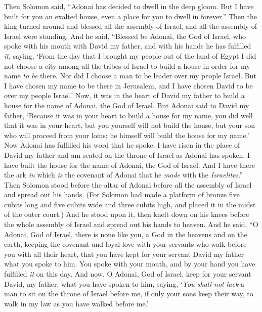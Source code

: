 \begin{biblechapter} %
 Then Solomon said, “Adonai has decided to dwell in the deep gloom.
\verse But I have built for you an exalted house, even a place for you to dwell in forever.”
\verse Then the king turned around and blessed all the assembly of Israel, and all the assembly of Israel were standing.
\verse And he said, “Blessed be Adonai, the God of Israel, who spoke with his mouth with David my father, and with his hands he has fulfilled \textit{it}, saying,
\verse ‘From the day that I brought my people out of the land of Egypt I did not choose a city among all the tribes of Israel to build a house in order for my name \textit{to be} there. Nor did I choose a man to be leader over my people Israel.
\verse But I have chosen my name to be there in Jerusalem, and I have chosen David to be over my people Israel.’
\verse Now, it was in the heart of David my father to build a house for the name of Adonai, the God of Israel.
\verse But Adonai said to David my father, ‘Because it was in your heart to build a house for my name, you did well that it was in your heart,
\verse but you yourself will not build the house, but your son who will proceed from your loins; he himself will build the house for my name.’
\verse Now Adonai has fulfilled his word that he spoke. I have risen in the place of David my father and am seated on the throne of Israel as Adonai has spoken. I have built the house for the name of Adonai, the God of Israel.
\verse And I have there the ark \textit{in} which \textit{is} the covenant of Adonai that he \textit{made} with the \textit{Israelites}.”
 Then Solomon stood before the altar of Adonai before all the assembly of Israel and spread out his hands.
\verse (For Solomon had made a platform of bronze five cubits long and five cubits wide and three cubits high, and placed it in the midst of the outer court.) And he stood upon it, then knelt down on his knees before the whole assembly of Israel and spread out his hands to heaven.
\verse And he said, “O Adonai, God of Israel, there is none like you, a God in the heavens and on the earth, keeping the covenant and loyal love with your servants who walk before you with all their heart,
\verse that you have kept for your servant David my father what you spoke to him. You spoke with your mouth, and by your hand you have fulfilled \textit{it} on this day.
\verse And now, O Adonai, God of Israel, keep for your servant David, my father, what you have spoken to him, saying, ‘\textit{You shall not lack} a man to sit on the throne of Israel before me, if only your sons keep their way, to walk in my law as you have walked before me.’

\end{biblechapter}
